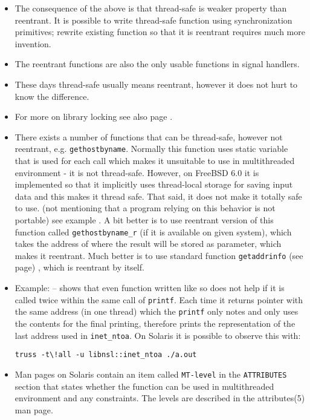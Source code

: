 \begin{itemize}
\item The consequence of the above is that thread-safe is weaker property
than reentrant. It is possible to write thread-safe function using
synchronization primitives; rewrite existing function so that it is reentrant
requires much more invention.
\item The reentrant functions are also the only usable functions in
signal handlers.
\item These days thread-safe usually means reentrant, however it does not
hurt to know the difference.
\item For more on library locking see also page \pageref{MUTEXES2}.
\item There exists a number of functions that can be thread-safe, however
not reentrant, e.g. \texttt{gethostbyname}. Normally this function uses
static variable that is used for each call which makes it unsuitable to use
in multithreaded environment - it is not thread-safe.
However, on FreeBSD 6.0 it is implemented so that it implicitly uses
thread-local storage for saving input data and this makes it
thread safe. That said, it does not make it totally safe to use.
(not mentioning that a program relying on this behavior is not portable)
see example .
A bit better is to use reentrant version of this function called 
\texttt{gethostbyname\_r} (if it is available on given system),
which takes the address of where the result will be stored as parameter,
which makes it reentrant. Much better is to use standard function
\texttt{getaddrinfo} (see page) \pageref{GETADDRINFO}, which is reentrant
by itself.

\item Example:  -- shows that even
function written like so does not help if it is called twice within
the same call of \texttt{printf}. Each time it returns pointer with
the same address (in one thread) which the \texttt{printf} only notes
and only uses the contents for the final printing, therefore prints
the representation of the last address used in \texttt{inet\_ntoa}.
On Solaris it is possible to observe this with:
\begin{verbatim}
truss -t\!all -u libnsl::inet_ntoa ./a.out
\end{verbatim}
\item Man pages on Solaris contain an item called
\texttt{MT-level} in the \texttt{ATTRIBUTES} section that states
whether the function can be used in multithreaded environment and
any constraints. The levels are described in the attributes(5) man page.
\end{itemize}

